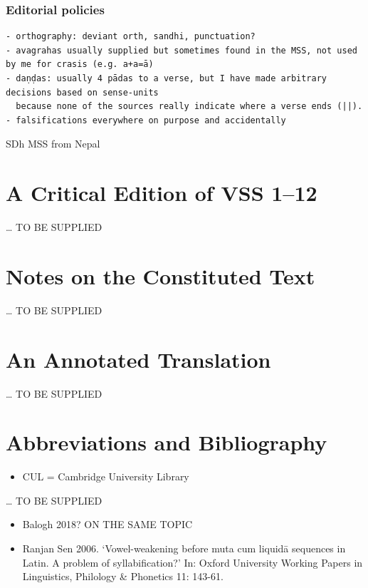 \documentclass[12pt]{book}
\begin{document}
{%
\subsubsection{Editorial policies}\label{editorial-policies}}

\begin{verbatim}
- orthography: deviant orth, sandhi, punctuation?
- avagrahas usually supplied but sometimes found in the MSS, not used by me for crasis (e.g. a+a=ā)
- daṇḍas: usually 4 pādas to a verse, but I have made arbitrary decisions based on sense-units 
  because none of the sources really indicate where a verse ends (||).
- falsifications everywhere on purpose and accidentally
\end{verbatim}

SDh MSS from Nepal

{%
\section{A Critical Edition of VSS
1--12}\label{a-critical-edition-of-vss-112}}

\ldots{} TO BE SUPPLIED

{%
\section{Notes on the Constituted
Text}\label{notes-on-the-constituted-text}}

\ldots{} TO BE SUPPLIED

{%
\section{An Annotated Translation}\label{an-annotated-translation}}

\ldots{} TO BE SUPPLIED

{%
\section{Abbreviations and
Bibliography}\label{abbreviations-and-bibliography}}

\begin{itemize}

\item
  CUL = Cambridge University Library 
\end{itemize}

\ldots{} TO BE SUPPLIED

\begin{itemize}
\item
  Balogh 2018? ON THE SAME TOPIC
\item
  Ranjan Sen 2006. `Vowel-weakening before muta cum liquidā sequences in
  Latin. A problem of syllabification?' In: Oxford University Working
  Papers in Linguistics, Philology \& Phonetics 11: 143-61.
\end{itemize}
\end{document}
